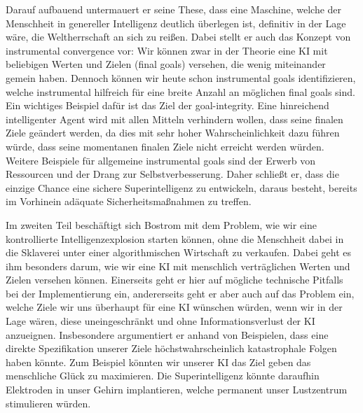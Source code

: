 \documentclass[twoside, a4paper, DIV=11, open=any, bibliography=totoc]{scrbook}
\newcommand{\Quote}[1]{\glqq #1\grqq{}}
\begin{document}
Darauf aufbauend untermauert er seine These, dass eine Maschine, welche der Menschheit
in genereller Intelligenz deutlich überlegen ist, definitiv in der Lage wäre,
die Weltherrschaft an sich zu reißen. Dabei stellt er auch das Konzept von
\Quote{instrumental convergence} vor: Wir können zwar in der Theorie eine KI
mit beliebigen Werten und Zielen (\Quote{final goals}) versehen, die wenig miteinander gemein haben.
Dennoch können wir heute schon \Quote{instrumental goals} identifizieren, welche
instrumental hilfreich für eine breite Anzahl an möglichen \Quote{final goals} sind.
Ein wichtiges Beispiel dafür ist das Ziel der \Quote{goal-integrity}. Eine hinreichend
intelligenter Agent wird mit allen Mitteln verhindern wollen, dass seine finalen Ziele
geändert werden, da dies mit sehr hoher Wahrscheinlichkeit dazu führen würde,
dass seine momentanen finalen Ziele nicht erreicht werden würden. Weitere Beispiele
für allgemeine \Quote{instrumental goals} sind der Erwerb von Ressourcen und der
Drang zur Selbstverbesserung.
Daher schließt er, dass die einzige Chance eine sichere Superintelligenz zu entwickeln,
daraus besteht, bereits im Vorhinein adäquate Sicherheitsmaßnahmen zu treffen.

Im zweiten Teil beschäftigt sich Bostrom mit dem Problem, wie wir eine kontrollierte
Intelligenzexplosion starten können, ohne die Menschheit dabei in die Sklaverei
unter einer algorithmischen Wirtschaft zu verkaufen. Dabei geht es ihm besonders
darum, wie wir eine KI mit menschlich verträglichen Werten und Zielen versehen können.
Einerseits geht er hier auf mögliche technische Pitfalls bei der Implementierung ein,
andererseits geht er aber auch auf das Problem ein, welche Ziele wir uns überhaupt
für eine KI wünschen würden, wenn wir in der Lage wären, diese uneingeschränkt und
ohne Informationsverlust der KI anzueignen.
Insbesondere argumentiert er anhand von Beispielen, dass eine direkte Spezifikation
unserer Ziele höchstwahrscheinlich katastrophale Folgen haben könnte.
Zum Beispiel könnten wir unserer KI das Ziel geben das menschliche Glück zu maximieren.
Die Superintelligenz könnte daraufhin Elektroden in unser Gehirn implantieren, welche
permanent unser Lustzentrum stimulieren würden.
\end{document}
